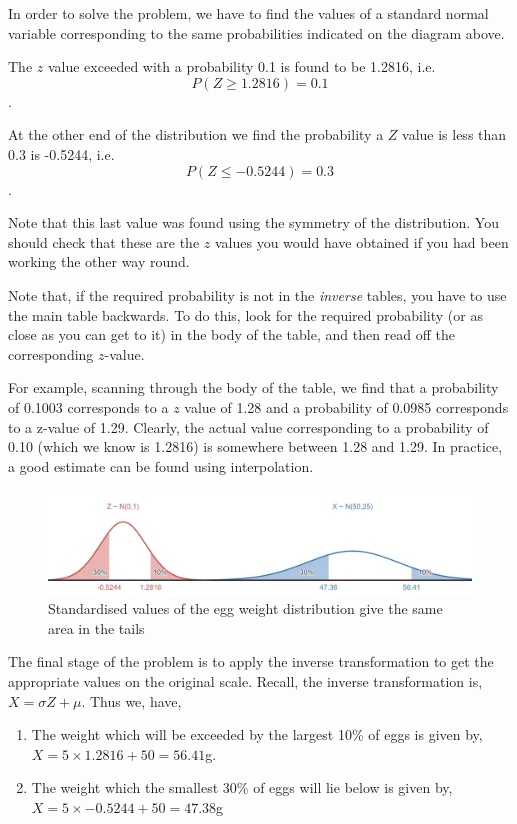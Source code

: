 \documentclass[
]{book}
\theoremstyle{definition}
\theoremstyle{definition}
\theoremstyle{definition}
\theoremstyle{definition}
\theoremstyle{remark}
\begin{document}
In order to solve the problem, we have to find the values of a standard normal variable corresponding to the same probabilities indicated on the diagram above.

The \(z\) value exceeded with a probability 0.1 is found to be 1.2816, i.e.~\[P(Z\geq 1.2816)=0.1\].

At the other end of the distribution we find the probability a \(Z\) value is less than 0.3 is -0.5244, i.e.~
\[P(Z\leq -0.5244)=0.3\].

Note that this last value was found using the symmetry of the distribution. You should check that these are the \(z\) values you would have obtained if you had been working the other way round.

Note that, if the required probability is not in the \emph{inverse} tables, you have to use the main table backwards. To do this, look for the required probability (or as close as you can get to it) in the body of the table, and then read off the corresponding \(z\)-value.

For example, scanning through the body of the table, we find that a probability of 0.1003 corresponds to a \(z\) value of 1.28 and a probability of 0.0985 corresponds to a z-value of 1.29. Clearly, the actual value corresponding to a probability of 0.10 (which we know is 1.2816) is somewhere between 1.28 and 1.29. In practice, a good estimate can be found using interpolation.

\begin{figure}

{\centering \includegraphics[width=0.75\linewidth]{./figures/inverseeggs} 

}

\caption{Standardised values of the egg weight distribution give the same area in the tails}\label{fig:inveggs}
\end{figure}

The final stage of the problem is to apply the inverse transformation to get the appropriate values on the original
scale. Recall, the inverse transformation is, \(X=\sigma Z+\mu\).
Thus we, have,

\begin{enumerate}
\def\labelenumi{\alph{enumi})}
\item
  The weight which will be exceeded by the largest 10\% of eggs is given
  by, \(X = 5\times 1.2816+50 = 56.41\)g.
\item
  The weight which the smallest 30\% of eggs will lie below is
  given by, \(X = 5\times -0.5244+50 = 47.38\)g
\end{enumerate}
\end{document}

